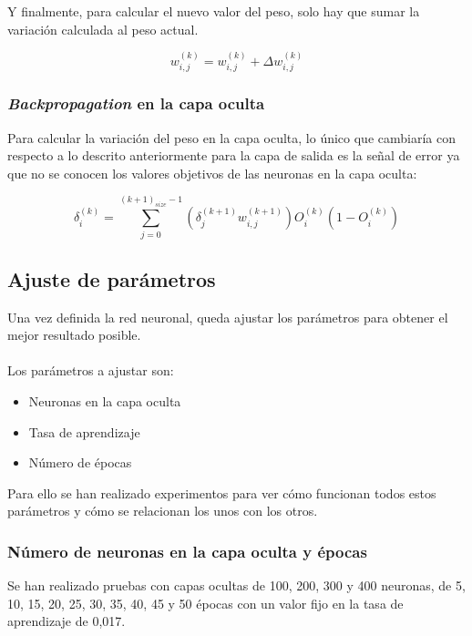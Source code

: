 Y finalmente, para calcular el nuevo valor del peso, solo hay que sumar la variación calculada al peso actual.

\[ w^{(k)}_{i,j} = w^{(k)}_{i,j} +\Delta w^{(k)}_{i,j} \]

\subsubsection{\textit{Backpropagation} en la capa oculta}

Para calcular la variación del peso en la capa oculta, lo único que cambiaría con respecto a lo descrito anteriormente para la capa de salida es la señal de error ya que no se conocen los valores objetivos de las neuronas en la capa oculta:

\[ \delta^{(k)}_{i} = \sum_{j=0}^{(k+1)_{size}-1}(\delta^{(k+1)}_{j} w^{(k+1)}_{i,j}) O^{(k)}_{i} (1 - O^{(k)}_{i}) \]

\subsection{Ajuste de parámetros}

Una vez definida la red neuronal, queda ajustar los parámetros para obtener el mejor resultado posible.
\\ \\
Los parámetros a ajustar son:
\begin{itemize}
	\item Neuronas en la capa oculta
	\item Tasa de aprendizaje
	\item Número de épocas
\end{itemize}

Para ello se han realizado experimentos para ver cómo funcionan todos estos parámetros y cómo se relacionan los unos con los otros.

\subsubsection{Número de neuronas en la capa oculta y épocas}

Se han realizado pruebas con capas ocultas de 100, 200, 300 y 400 neuronas, de 5, 10, 15, 20, 25, 30, 35, 40, 45 y 50 épocas con un valor fijo en la tasa de aprendizaje de 0,017.

